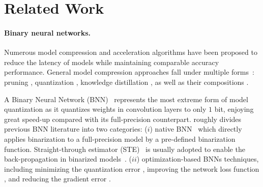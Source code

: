 \documentclass[final]{cvpr}
\begin{document}
\section{Related Work}
\paragraph{Binary neural networks.} Numerous model compression and acceleration algorithms have been proposed to reduce the latency of models while maintaining comparable accuracy performance. General model compression approaches fall under multiple forms~\cite{cheng2017survey}: pruning \cite{han2015learning,wen2016learning}, quantization \cite{wu2016quantized,shen2020fractional,fu2020fractrain}, knowledge distillation \cite{hinton2015distilling,mishra2017apprentice}, as well as their compositions \cite{wang2019e2,you2020shiftaddnet,zhao2020smartexchange}.


A Binary Neural Network (BNN)~\cite{courbariaux2015binaryconnect,courbariaux2016binarized,kim2016bitwise,zhou2016dorefa,rastegari2016xnor,courbariaux2016binarized,li2017performance,polino2018model,mishra2017apprentice,hou2016loss,zhou2017incremental,liu2018bi,helwegen2019latent,liu2019circulant,cai2017deep,shen2019searching,han2020training,xu2021learning} represents the most extreme form of model quantization as it quantizes weights in convolution layers to only $1$ bit, enjoying great speed-up compared with its full-precision counterpart. \cite{qin2020binary} roughly divides previous BNN literature into two categories: ($i$) native BNN~\cite{courbariaux2015binaryconnect,courbariaux2016binarized,kim2016bitwise} which directly applies binarization to a full-precision model by a pre-defined binarization function. Straight-through estimator (STE)~\cite{hinton2012,bengio2013estimating} is usually adopted to enable the back-propagation in binarized models~\cite{courbariaux2015binaryconnect}. ($ii$) optimization-based BNNs techniques, including minimizing the quantization error \cite{zhou2016dorefa,rastegari2016xnor,courbariaux2016binarized,li2017performance}, improving the network loss function \cite{polino2018model,mishra2017apprentice,hou2016loss,zhou2017incremental}, and reducing the gradient error \cite{liu2018bi,helwegen2019latent,liu2019circulant,cai2017deep}.
\end{document}
